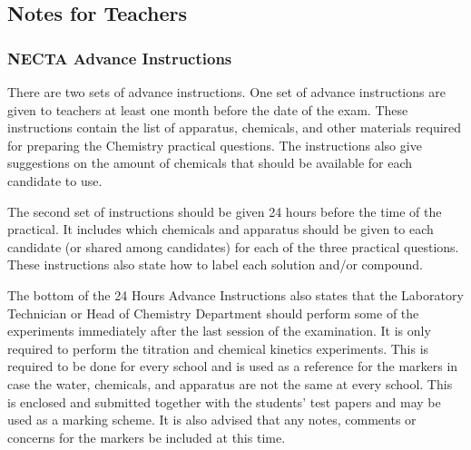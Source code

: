 \subsection{Notes for Teachers}

\subsubsection{NECTA Advance Instructions}
There are two sets of advance instructions. One set of advance instructions are given to teachers at least one month before the date of the exam. These instructions contain the list of apparatus, chemicals, and other materials required for preparing the Chemistry practical questions. The instructions also give suggestions on the amount of chemicals that should be available for each candidate to use.

The second set of instructions should be given 24 hours before the time of the practical. It includes which chemicals and apparatus should be given to each candidate (or shared among candidates) for each of the three practical questions. These instructions also state how to label each solution and/or compound.

The bottom of the 24 Hours Advance Instructions also states that the Laboratory Technician or Head of Chemistry Department should perform some of the experiments immediately after the last session of the examination. It is only required to perform the titration and chemical kinetics experiments. This is required to be done for every school and is used as a reference for the markers in case the water, chemicals, and apparatus are not the same at every school. This is enclosed and submitted together with the students' test papers and may be used as a marking scheme. It is also advised that any notes, comments or concerns for the markers be included at this time.




